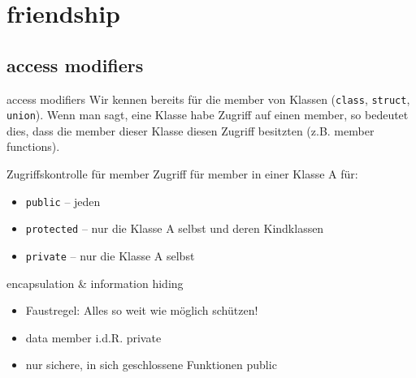 \section{friendship}





\subsection{access modifiers}

\begin{frame}[fragile]{access modifiers}
	Wir kennen bereits für die member von Klassen (\verb|class|, \verb|struct|, \verb|union|).
	Wenn man sagt, eine Klasse habe Zugriff auf einen member, so bedeutet dies, dass die member dieser Klasse diesen Zugriff besitzten (z.B. member functions).
	
	\pause
	
	\begin{block}{Zugriffskontrolle für member}
		Zugriff für member in einer Klasse A für:
		\begin{itemize}[<+->]
			\item \verb|public| -- jeden
			\item \verb|protected| -- nur die Klasse A selbst und deren Kindklassen
			\item \verb|private| -- nur die Klasse A selbst
		\end{itemize}
	\end{block}
\end{frame}


\begin{frame}{encapsulation \& information hiding}
	\begin{itemize}[<+->]
		\item Faustregel: Alles so weit wie möglich schützen!
		\item data member i.d.R. private
		\item nur sichere, in sich geschlossene Funktionen public
	\end{itemize}
\end{frame}



